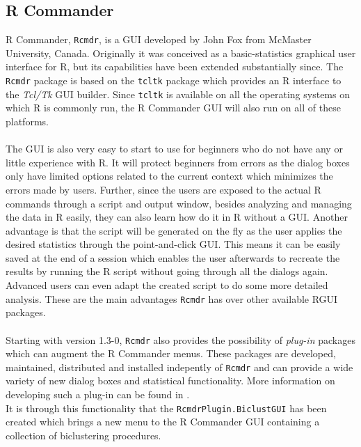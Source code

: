 \documentclass[a4paper]{article}\usepackage[]{graphicx}\usepackage[]{color}
\begin{document}
\subsection{R Commander}
R Commander, \verb|Rcmdr|\citep{Fox2005}, is a GUI developed by John Fox from
McMaster University, Canada. Originally it was conceived as a basic-statistics graphical
user interface for R, but its capabilities have been extended substantially
since. The \verb|Rcmdr| package is based on the \verb|tcltk| package
\citep{Dalgaard2001} which provides an R interface to the {\it Tcl/Tk} GUI builder. 
Since \verb|tcltk| is available on all the operating systems on which R is
commonly run, the R Commander GUI will also run on all of these platforms.\\ \\
The GUI is also very easy to start to use for beginners who do not have any
or little experience with R. It will protect beginners from errors as the dialog
boxes only have limited options related to the current context which minimizes
the errors made by users. Further, since the users are exposed to the actual
R commands through a script and output window, besides analyzing and managing
the data in R easily, they can also learn how do it in R without a GUI.
Another advantage is that the script will be generated on the fly as the user
applies the desired statistics through the point-and-click GUI. This means it can be easily
saved at the end of a session which enables the user afterwards to recreate the
results by running the R script without going through all the dialogs again.
Advanced users can even adapt the created script to do some more detailed
analysis. These are the main advantages \verb|Rcmdr| has over other available
RGUI packages.\\ \\
Starting with version 1.3-0, \verb|Rcmdr| also provides the possibility of {\it
plug-in} packages which can augment the R Commander menus. These packages are
developed, maintained, distributed and installed indepently of \verb|Rcmdr| and
can provide a wide variety of new dialog boxes and statistical functionality.
More information on developing such a plug-in can be found in \citet{Fox2007}.\\
It is through this functionality that the \verb|RcmdrPlugin.BiclustGUI| has been
created which brings a new menu to the R Commander GUI containing a collection
of biclustering procedures.
\end{document}
